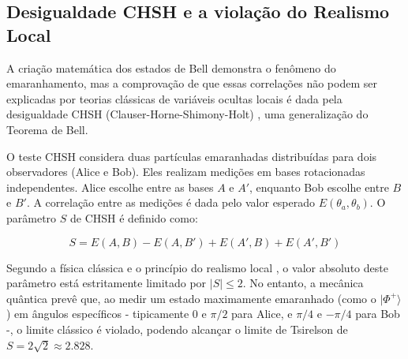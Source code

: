 \documentclass[12pt, a4paper]{article}
\newcommand{\ket}[1]{\lvert #1 \rangle}
\begin{document}
\subsection{Desigualdade CHSH e a violação do Realismo Local}

A criação matemática dos estados de Bell demonstra o fenômeno do emaranhamento, mas a comprovação de que essas correlações não podem ser explicadas por teorias clássicas de variáveis ocultas locais é dada pela desigualdade CHSH (Clauser-Horne-Shimony-Holt) \cite{clauser1969proposed}, uma generalização do Teorema de Bell.

O teste CHSH considera duas partículas emaranhadas distribuídas para dois observadores (Alice e Bob). Eles realizam medições em bases rotacionadas independentes. Alice escolhe entre as bases $A$ e $A'$, enquanto Bob escolhe entre $B$ e $B'$. A correlação entre as medições é dada pelo valor esperado $E(\theta_a, \theta_b)$. O parâmetro $S$ de CHSH é definido como:

\begin{equation}
    S = E(A, B) - E(A, B') + E(A', B) + E(A', B')
\end{equation}

Segundo a física clássica e o princípio do realismo local \cite{nielsen2010}, o valor absoluto deste parâmetro está estritamente limitado por $|S| \le 2$. No entanto, a mecânica quântica prevê que, ao medir um estado maximamente emaranhado (como o
$\ket{\Phi^+}$) em ângulos específicos - tipicamente $0$ e $\pi/2$ para Alice, e $\pi/4$ e $-\pi/4$ para Bob -, o limite clássico é violado, podendo alcançar o limite de Tsirelson de $S = 2\sqrt{2} \approx 2.828$.
\end{document}
